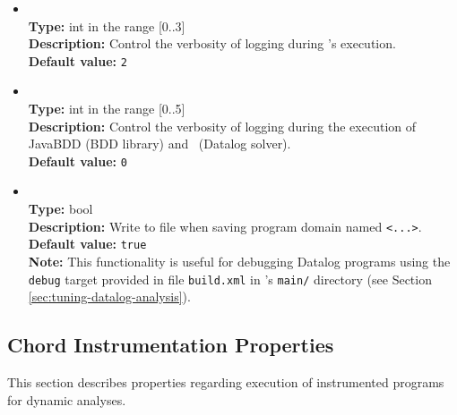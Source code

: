 \begin{itemize}
\item
{} \\
{\bf Type:} int in the range [0..3] \\
{\bf Description:} Control the verbosity of logging during \Chord's execution. \\
{\bf Default value:} {\tt 2} 

\item
{} \\
{\bf Type:} int in the range [0..5] \\
{\bf Description:} Control the verbosity of logging during the execution of JavaBDD (BDD library) and \bddbddb\ (Datalog solver). \\
{\bf Default value:} {\tt 0} 

\item
{} \\
{\bf Type:} bool \\
{\bf Description:} Write to file  when saving program domain named {\tt <...>}. \\
{\bf Default value:} {\tt true}  \\
{\bf Note:} This functionality is useful for debugging Datalog programs using the {\tt debug} target provided in file {\tt build.xml} in \Chord's {\tt main/} directory (see Section \ref{sec:tuning-datalog-analysis}).
\end{itemize}

\subsection{Chord Instrumentation Properties}
\label{sec:instr-props}

This section describes properties regarding execution of instrumented programs for dynamic analyses.


